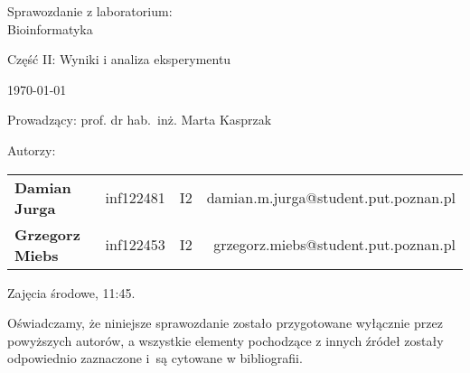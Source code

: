 \thispagestyle{empty} %

\begin{center}
{\large{Sprawozdanie z laboratorium:\\
Bioinformatyka}}

\vspace{3ex}

Część II: Wyniki i analiza eksperymentu

\vspace{3ex}
{\footnotesize\today}

\end{center}


\vspace{10ex}

Prowadzący: prof. dr hab.~inż. Marta Kasprzak

\vspace{5ex}

Autorzy:
\begin{tabular}{lllr}
\textbf{Damian Jurga} & inf122481 & I2 & damian.m.jurga@student.put.poznan.pl \\
\textbf{Grzegorz Miebs} & inf122453 & I2 & grzegorz.miebs@student.put.poznan.pl \\
\end{tabular}

\vspace{5ex}

Zajęcia środowe, 11:45.

\vspace{35ex}

\noindent Oświadczamy, że niniejsze sprawozdanie zostało przygotowane wyłącznie przez powyższych autorów,
a wszystkie elementy pochodzące z innych źródeł zostały odpowiednio zaznaczone i~są cytowane w bibliografii.  

\newpage

